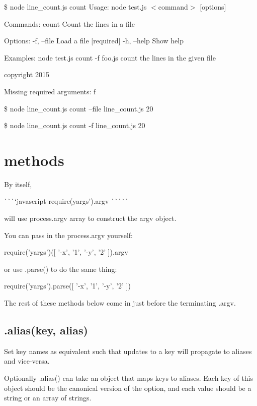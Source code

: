 \$ node line\+\_\+count.\+js count Usage\+: node test.\+js $<$command$>$ \mbox{[}options\mbox{]}

Commands\+: count Count the lines in a file

Options\+: -\/f, --file Load a file \mbox{[}required\mbox{]} -\/h, --help Show help

Examples\+: node test.\+js count -\/f foo.\+js count the lines in the given file

copyright 2015

Missing required arguments\+: f

\$ node line\+\_\+count.\+js count --file line\+\_\+count.\+js 20

\$ node line\+\_\+count.\+js count -\/f line\+\_\+count.\+js 20

\section*{methods }

By itself,

\`{}\`{}\`{}`javascript require(\textquotesingle{}yargs').argv \`{}\`{}\`{}\`{}\`{}

will use {\ttfamily process.\+argv} array to construct the {\ttfamily argv} object.

You can pass in the {\ttfamily process.\+argv} yourself\+:


\begin{DoxyCode}
require('yargs')([ '-x', '1', '-y', '2' ]).argv
\end{DoxyCode}


or use .parse() to do the same thing\+:


\begin{DoxyCode}
require('yargs').parse([ '-x', '1', '-y', '2' ])
\end{DoxyCode}


The rest of these methods below come in just before the terminating {\ttfamily .argv}.

\subsection*{.alias(key, alias) }

Set key names as equivalent such that updates to a key will propagate to aliases and vice-\/versa.

Optionally {\ttfamily .alias()} can take an object that maps keys to aliases. Each key of this object should be the canonical version of the option, and each value should be a string or an array of strings.

